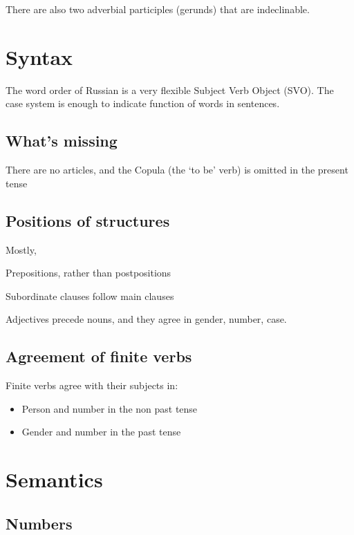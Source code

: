 \documentclass[
  a4paperpaper,
]{report}
\providecommand{\tightlist}{%
  \setlength{\itemsep}{0pt}\setlength{\parskip}{0pt}}
\begin{document}
There are also two adverbial participles (gerunds) that are
indeclinable.

\hypertarget{syntax}{%
\chapter{Syntax}\label{syntax}}

The word order of Russian is a very flexible Subject Verb Object (SVO).
The case system is enough to indicate function of words in sentences.

\hypertarget{whats-missing}{%
\section{What's missing}\label{whats-missing}}

There are no articles, and the Copula (the `to be' verb) is omitted in
the present tense

\hypertarget{positions-of-structures}{%
\section{Positions of structures}\label{positions-of-structures}}

Mostly,

Prepositions, rather than postpositions

Subordinate clauses follow main clauses

Adjectives precede nouns, and they agree in gender, number, case.

\hypertarget{agreement-of-finite-verbs}{%
\section{Agreement of finite verbs}\label{agreement-of-finite-verbs}}

Finite verbs agree with their subjects in:

\begin{itemize}
\tightlist
\item
  Person and number in the non past tense
\item
  Gender and number in the past tense
\end{itemize}

\hypertarget{semantics}{%
\chapter{Semantics}\label{semantics}}

\hypertarget{numbers}{%
\section{Numbers}\label{numbers}}
\end{document}
